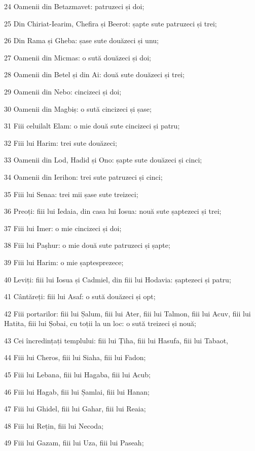 \par 24 Oamenii din Betazmavet: patruzeci și doi;
\par 25 Din Chiriat-Iearim, Chefira și Beerot: șapte sute patruzeci și trei;
\par 26 Din Rama și Gheba: șase sute douăzeci și unu;
\par 27 Oamenii din Micmas: o sută douăzeci și doi;
\par 28 Oamenii din Betel și din Ai: două sute douăzeci și trei;
\par 29 Oamenii din Nebo: cincizeci și doi;
\par 30 Oamenii din Magbiș: o sută cincizeci și șase;
\par 31 Fiii celuilalt Elam: o mie două sute cincizeci și patru;
\par 32 Fiii lui Harim: trei sute douăzeci;
\par 33 Oamenii din Lod, Hadid și Ono: șapte sute douăzeci și cinci;
\par 34 Oamenii din Ierihon: trei sute patruzeci și cinci;
\par 35 Fiii lui Senaa: trei mii șase sute treizeci;
\par 36 Preoți: fiii lui Iedaia, din casa lui Iosua: nouă sute șaptezeci și trei;
\par 37 Fiii lui Imer: o mie cincizeci și doi;
\par 38 Fiii lui Pașhur: o mie două sute patruzeci și șapte;
\par 39 Fiii lui Harim: o mie șaptesprezece;
\par 40 Leviți: fiii lui Iosua și Cadmiel, din fiii lui Hodavia: șaptezeci și patru;
\par 41 Cântăreți: fiii lui Asaf: o sută douăzeci și opt;
\par 42 Fiii portarilor: fiii lui Șalum, fiii lui Ater, fiii lui Talmon, fiii lui Acuv, fiii lui Hatita, fiii lui Șobai, cu toții la un loc: o sută treizeci și nouă;
\par 43 Cei încredințați templului: fiii lui Țiha, fiii lui Hasufa, fiii lui Tabaot,
\par 44 Fiii lui Cheros, fiii lui Siaha, fiii lui Fadon;
\par 45 Fiii lui Lebana, fiii lui Hagaba, fiii lui Acub;
\par 46 Fiii lui Hagab, fiii lui Șamlai, fiii lui Hanan;
\par 47 Fiii lui Ghidel, fiii lui Gahar, fiii lui Reaia;
\par 48 Fiii lui Rețin, fiii lui Necoda;
\par 49 Fiii lui Gazam, fiii lui Uza, fiii lui Paseah;

